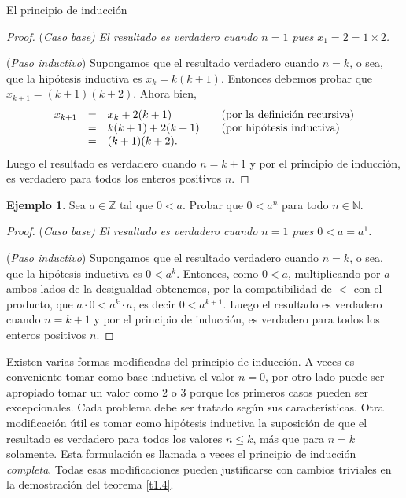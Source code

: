 \documentclass[11pt,spanish,makeidx]{amsbook}
\theoremstyle{definition}
\newtheorem{ejemplo}{Ejemplo}[section]
\theoremstyle{remark}
\begin{document}
\begin{section}{El principio de inducción}
\begin{proof}
\noindent(\it Caso  base\rm) El resultado es verdadero cuando $n=1$ pues $ x_1 = 2=1\times2$.

\noindent ({\it Paso  inductivo})  Supongamos que el resultado verdadero cuando $n=k$, o sea, que la hipótesis inductiva es $x_k = k(k+1)$. Entonces debemos probar  que $x_{k+1} = (k+1)(k+2)$. Ahora bien, 
\begin{equation*}
	\begin{matrix} 
	x_{k+1} &=& x_k + 2(k+1) \hfill &\quad \text{(por la definición recursiva)} \hfill \\
	&=& k(k+1)+2(k+1) \hfill &\quad \text{(por hipótesis inductiva)}\hfill \\
	&=& (k+1)(k+2). \hfill &
	\end{matrix}
\end{equation*}
Luego el resultado es verdadero cuando $n=k+1$ y por el principio de inducción, es verdadero para todos los enteros positivos $n$.
\end{proof}


\begin{ejemplo}\label{ejemplo141} Sea $a\in \mathbb Z$ tal que $0<a$. Probar que $0<a^n$ para todo $n \in \mathbb N$.
\end{ejemplo}
\begin{proof}
	
	\noindent(\it Caso  base\rm) El resultado es verdadero cuando $n=1$ pues $ 0 < a=a^1$.
	
	\noindent ({\it Paso  inductivo})  Supongamos que el resultado verdadero cuando $n=k$, o sea, que la hipótesis inductiva es $0 < a^k$. Entonces, como $0<a$, multiplicando por $a$ ambos lados de la desigualdad obtenemos, por la compatibilidad de $<$ con el producto, que $a\cdot 0 < a^k\cdot a$, es decir $0<a^{k+1}$. Luego el resultado es verdadero cuando $n=k+1$ y por el principio de inducción, es verdadero para todos los enteros positivos $n$.
\end{proof}


Existen varias formas modificadas del principio de inducción. A veces es conveniente tomar como base inductiva el valor $n=0$, por otro lado puede ser apropiado tomar un valor como $2$ o $3$ porque los primeros casos pueden ser excepcionales. Cada problema debe ser tratado según sus características. Otra modificación útil es tomar como hipótesis inductiva la suposición de que el resultado es verdadero para todos los valores $n\le k$, más que para $n=k$ solamente. Esta formulación es llamada a veces el principio de inducción {\it completa}. Todas esas modificaciones pueden justificarse con cambios triviales en la demostración del teorema \ref{t1.4}.


\end{section}
\end{document}
